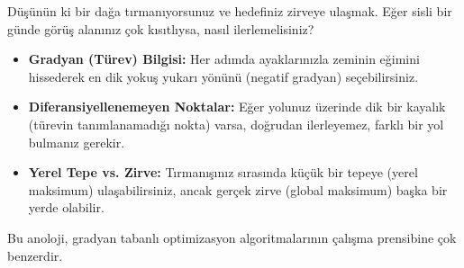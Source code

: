 \begin{tcolorbox}[title=Gerçek Hayat Örneği: Tepeye Tırmanma]
Düşünün ki bir dağa tırmanıyorsunuz ve hedefiniz zirveye ulaşmak. Eğer sisli bir günde görüş alanınız çok kısıtlıysa, nasıl ilerlemelisiniz?

\begin{itemize}
    \item \textbf{Gradyan (Türev) Bilgisi:} Her adımda ayaklarınızla zeminin eğimini hissederek en dik yokuş yukarı yönünü (negatif gradyan) seçebilirsiniz.
    \item \textbf{Diferansiyellenemeyen Noktalar:} Eğer yolunuz üzerinde dik bir kayalık (türevin tanımlanamadığı nokta) varsa, doğrudan ilerleyemez, farklı bir yol bulmanız gerekir.
    \item \textbf{Yerel Tepe vs. Zirve:} Tırmanışınız sırasında küçük bir tepeye (yerel maksimum) ulaşabilirsiniz, ancak gerçek zirve (global maksimum) başka bir yerde olabilir.
\end{itemize}

Bu anoloji, gradyan tabanlı optimizasyon algoritmalarının çalışma prensibine çok benzerdir.
\end{tcolorbox}


